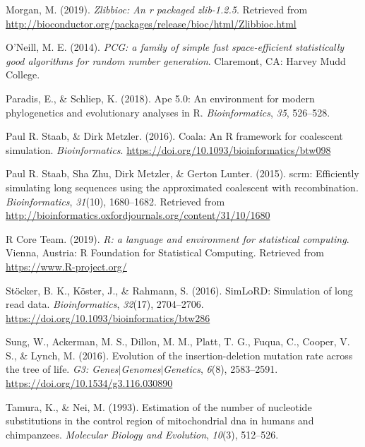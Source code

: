 \documentclass[12pt,]{article}
\begin{document}
\leavevmode\hypertarget{ref-Morgan_2019}{}%
Morgan, M. (2019). \emph{Zlibbioc: An r packaged zlib-1.2.5}. Retrieved from \url{http://bioconductor.org/packages/release/bioc/html/Zlibbioc.html}

\leavevmode\hypertarget{ref-Oneill_2014pcg}{}%
O'Neill, M. E. (2014). \emph{PCG: a family of simple fast space-efficient statistically good algorithms for random number generation}. Claremont, CA: Harvey Mudd College.

\leavevmode\hypertarget{ref-Paradis_2018}{}%
Paradis, E., \& Schliep, K. (2018). Ape 5.0: An environment for modern phylogenetics and evolutionary analyses in R. \emph{Bioinformatics}, \emph{35}, 526--528.

\leavevmode\hypertarget{ref-Paul_R._Staab_2016}{}%
Paul R. Staab, \& Dirk Metzler. (2016). Coala: An R framework for coalescent simulation. \emph{Bioinformatics}. \url{https://doi.org/10.1093/bioinformatics/btw098}

\leavevmode\hypertarget{ref-Paul_R._Staab_2015}{}%
Paul R. Staab, Sha Zhu, Dirk Metzler, \& Gerton Lunter. (2015). scrm: Efficiently simulating long sequences using the approximated coalescent with recombination. \emph{Bioinformatics}, \emph{31}(10), 1680--1682. Retrieved from \url{http://bioinformatics.oxfordjournals.org/content/31/10/1680}

\leavevmode\hypertarget{ref-R_Core_Team_2019}{}%
R Core Team. (2019). \emph{R: a language and environment for statistical computing}. Vienna, Austria: R Foundation for Statistical Computing. Retrieved from \url{https://www.R-project.org/}

\leavevmode\hypertarget{ref-St_cker_2016}{}%
Stöcker, B. K., Köster, J., \& Rahmann, S. (2016). SimLoRD: Simulation of long read data. \emph{Bioinformatics}, \emph{32}(17), 2704--2706. \url{https://doi.org/10.1093/bioinformatics/btw286}

\leavevmode\hypertarget{ref-Sung_2016}{}%
Sung, W., Ackerman, M. S., Dillon, M. M., Platt, T. G., Fuqua, C., Cooper, V. S., \& Lynch, M. (2016). Evolution of the insertion-deletion mutation rate across the tree of life. \emph{G3: Genes\(\vert\)Genomes\(\vert\)Genetics}, \emph{6}(8), 2583--2591. \url{https://doi.org/10.1534/g3.116.030890}

\leavevmode\hypertarget{ref-TN93}{}%
Tamura, K., \& Nei, M. (1993). Estimation of the number of nucleotide substitutions in the control region of mitochondrial dna in humans and chimpanzees. \emph{Molecular Biology and Evolution}, \emph{10}(3), 512--526.
\end{document}
